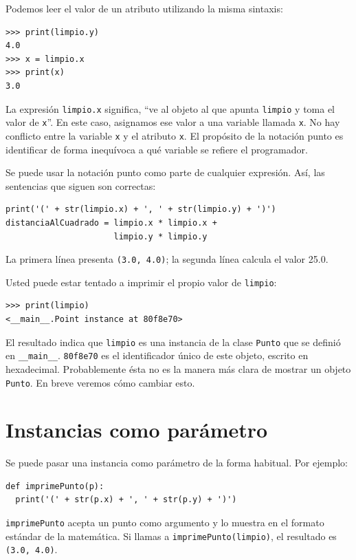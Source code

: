 Podemos leer el valor de un atributo utilizando la misma sintaxis:

\begin{lstlisting}
>>> print(limpio.y)
4.0
>>> x = limpio.x
>>> print(x)
3.0
\end{lstlisting}
La expresión \texttt{limpio.x} significa, ``ve al objeto al que apunta
\texttt{limpio} y toma el valor de \texttt{x}''. En este caso, asignamos
ese valor a una variable llamada \texttt{x}. No hay conflicto entre
la variable \texttt{x} y el atributo \texttt{x}. El propósito de la
notación punto es identificar de forma inequívoca a qué variable se
refiere el programador.

Se puede usar la notación punto como parte de cualquier expresión.
Así, las sentencias que siguen son correctas:
\begin{lstlisting}
print('(' + str(limpio.x) + ', ' + str(limpio.y) + ')')
distanciaAlCuadrado = limpio.x * limpio.x + 
                      limpio.y * limpio.y
\end{lstlisting}
La primera línea presenta \texttt{(3.0, 4.0)}; la segunda línea calcula
el valor 25.0.

Usted puede estar tentado a imprimir el propio valor de \texttt{limpio}:
\begin{lstlisting}
>>> print(limpio)
<__main__.Point instance at 80f8e70>
\end{lstlisting}
El resultado indica que \texttt{limpio} es una instancia de la clase
\texttt{Punto} que se definió en \texttt{\_\_main\_\_}. \texttt{80f8e70}
es el identificador único de este objeto, escrito en hexadecimal.
Probablemente ésta no es la manera más clara de mostrar un objeto
\texttt{Punto}. En breve veremos cómo cambiar esto.


\section{Instancias como parámetro}

 

Se puede pasar una instancia como parámetro de la forma habitual.
Por ejemplo:
\begin{lstlisting}
def imprimePunto(p):
  print('(' + str(p.x) + ', ' + str(p.y) + ')')
\end{lstlisting}
\texttt{imprimePunto} acepta un punto como argumento y lo muestra
en el formato estándar de la matemática. Si llamas a \texttt{imprimePunto(limpio)},
el resultado es \texttt{(3.0, 4.0)}.

